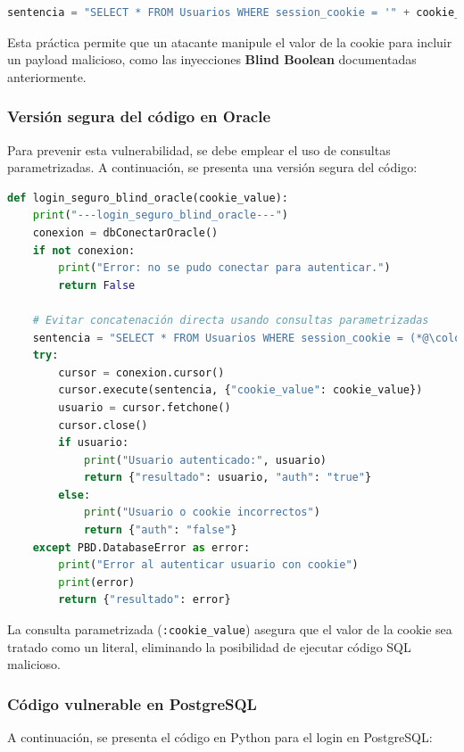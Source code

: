 \documentclass[a4paper,12pt]{article}
\begin{document}
\begin{lstlisting}[language=Python]
sentencia = "SELECT * FROM Usuarios WHERE session_cookie = '" + cookie_value + "'"
\end{lstlisting}

Esta práctica permite que un atacante manipule el valor de la cookie para incluir un payload malicioso, como las inyecciones \textbf{Blind Boolean} documentadas anteriormente.

\subsubsection{Versión segura del código en Oracle}

Para prevenir esta vulnerabilidad, se debe emplear el uso de consultas parametrizadas. A continuación, se presenta una versión segura del código:

\begin{lstlisting}[language=Python]
def login_seguro_blind_oracle(cookie_value):
    print("---login_seguro_blind_oracle---")
    conexion = dbConectarOracle()
    if not conexion:
        print("Error: no se pudo conectar para autenticar.")
        return False

    # Evitar concatenación directa usando consultas parametrizadas
    sentencia = "SELECT * FROM Usuarios WHERE session_cookie = (*@\colorbox{yellow}{:cookie\_value}@*)"
    try:
        cursor = conexion.cursor()
        cursor.execute(sentencia, {"cookie_value": cookie_value})
        usuario = cursor.fetchone()
        cursor.close()
        if usuario:
            print("Usuario autenticado:", usuario)
            return {"resultado": usuario, "auth": "true"}
        else:
            print("Usuario o cookie incorrectos")
            return {"auth": "false"}
    except PBD.DatabaseError as error:
        print("Error al autenticar usuario con cookie")
        print(error)
        return {"resultado": error}
\end{lstlisting}

La consulta parametrizada (\texttt{:cookie\_value}) asegura que el valor de la cookie sea tratado como un literal, eliminando la posibilidad de ejecutar código SQL malicioso.

\subsubsection{Código vulnerable en PostgreSQL}

A continuación, se presenta el código en Python para el login en PostgreSQL:
\end{document}
